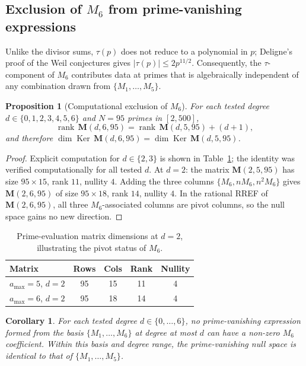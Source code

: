 \documentclass[11pt]{article}
\newtheorem{proposition}[theorem]{Proposition}
\newtheorem{corollary}[theorem]{Corollary}
\newcommand{\rank}{\operatorname{rank}}
\newcommand{\Ker}{\operatorname{Ker}}
\begin{document}
\subsection{Exclusion of $M_6$ from prime-vanishing expressions}

Unlike the divisor sums, $\tau(p)$ does not reduce to a polynomial in $p$;
Deligne's proof of the Weil conjectures \cite{Deligne1974} gives $|\tau(p)|\le 2p^{11/2}$.
Consequently, the $\tau$-component of $M_6$ contributes data at primes that is algebraically
independent of any combination drawn from $\{M_1,\dots,M_5\}$.

\begin{proposition}[Computational exclusion of $M_6$]
\label{thm:M6-exclusion}
For each tested degree $d\in\{0,1,2,3,4,5,6\}$ and $N=95$ primes in $[2,500]$,
\[
\rank\,\mathbf{M}(d,6,95)=\rank\,\mathbf{M}(d,5,95)+(d+1),
\]
and therefore $\dim\Ker\,\mathbf{M}(d,6,95)=\dim\Ker\,\mathbf{M}(d,5,95)$.
\end{proposition}

\begin{proof}
Explicit computation for $d\in\{2,3\}$ is shown in Table~\ref{tab:pivot-check};
the identity was verified computationally for all tested $d$.
At $d=2$: the matrix $\mathbf{M}(2,5,95)$ has size $95\times 15$, rank $11$, nullity $4$.
Adding the three columns $\{M_6,nM_6,n^2M_6\}$ gives $\mathbf{M}(2,6,95)$ of size
$95\times 18$, rank $14$, nullity $4$.
In the rational RREF of $\mathbf{M}(2,6,95)$, all three $M_6$-associated columns are
pivot columns, so the null space gains no new direction.
\end{proof}

\begin{table}[htbp]
\centering
\caption{Prime-evaluation matrix dimensions at $d=2$, illustrating the pivot status of $M_6$.}
\label{tab:pivot-check}
\begin{tabular}{@{}lcccc@{}}
\toprule
Matrix & Rows & Cols & Rank & Nullity \\
\midrule
$a_{\max}=5$, $d=2$ & 95 & 15 & 11 & 4 \\
$a_{\max}=6$, $d=2$ & 95 & 18 & 14 & 4 \\
\bottomrule
\end{tabular}
\end{table}

\begin{corollary}
\label{cor:M6-within-basis}
For each tested degree $d\in\{0,\dots,6\}$, no prime-vanishing expression formed from the
basis $\{M_1,\dots,M_6\}$ at degree at most $d$ can have a non-zero $M_6$ coefficient.
Within this basis and degree range, the prime-vanishing null space is identical to that of
$\{M_1,\dots,M_5\}$.
\end{corollary}
\end{document}
